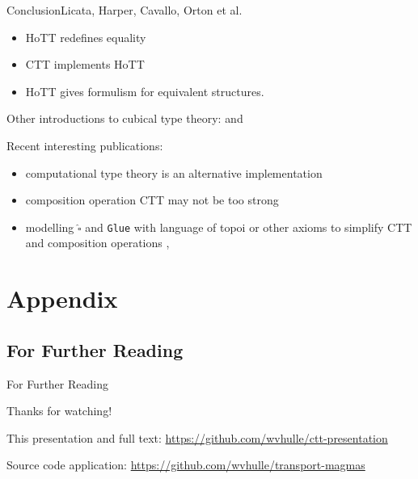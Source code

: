 \documentclass[english,handout]{beamer}
\begin{document}
\begin{frame}{Conclusion}{Licata, Harper, Cavallo, Orton et al.}
    
    
    \begin{itemize}
        \item HoTT redefines equality
        \item CTT implements HoTT 
        \item HoTT gives formulism for equivalent structures.
    \end{itemize}
    
    Other introductions to cubical type theory: \cite{Huber2016} and \cite{Orton2019}
    
    Recent interesting publications:
    \begin{itemize}
        \item computational type theory is an alternative implementation \cite{Angiuli2018}
        \item composition operation CTT may not be too strong \cite{Cavallo2019}
        \item modelling $\widehat{\square}$ and \texttt{Glue} with language of topoi or other axioms to simplify CTT and composition operations \cite{Orton2017}, \cite{Orton2019} 
    \end{itemize}
    
    
    \end{frame}





\appendix

\section*{Appendix}

\subsection*{For Further Reading}
\begin{frame}[allowframebreaks]{For Further Reading}

  Thanks for watching!

  
  This presentation and full text:
  \url{https://github.com/wvhulle/ctt-presentation}

  
  Source code application:
  \url{https://github.com/wvhulle/transport-magmas}

  


\end{frame}
\end{document}
